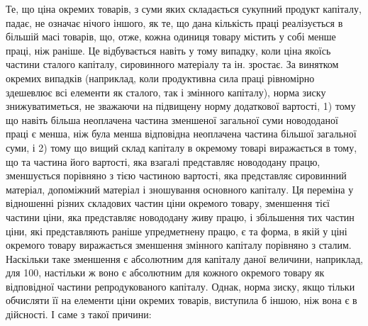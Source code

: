 Те, що ціна окремих товарів, з суми яких складається сукупний продукт капіталу, падає, не означає
нічого іншого, як те, що дана кількість праці реалізується в більшій масі товарів, що, отже, кожна
одиниця товару містить у собі менше праці, ніж раніше. Це відбувається навіть у тому випадку, коли
ціна якоїсь частини сталого капіталу, сировинного матеріалу та ін. зростає. За винятком окремих
випадків (наприклад, коли продуктивна сила праці рівномірно здешевлює всі елементи як сталого, так і
змінного капіталу), норма зиску знижуватиметься, не зважаючи на підвищену норму додаткової вартості,
1) тому що навіть більша неоплачена частина зменшеної загальної суми новододаної праці є менша, ніж
була менша відповідна неоплачена частина більшої загальної суми, і 2) тому що вищий склад капіталу в
окремому товарі виражається в тому, що та частина його вартості, яка взагалі представляє новододану
працю, зменшується порівняно з тією частиною вартості, яка представляє сировинний матеріал,
допоміжний матеріал і зношування основного капіталу. Ця переміна у відношенні різних складових
частин ціни окремого товару, зменшення тієї частини ціни, яка представляє новододану живу працю, і
збільшення тих частин ціни, які представляють раніше упредметнену працю, є та форма, в якій у ціні
окремого товару виражається зменшення змінного капіталу порівняно з сталим. Наскільки таке зменшення
є абсолютним для капіталу даної величини, наприклад, для 100, настільки ж воно є абсолютним для
кожного окремого товару як відповідної частини репродукованого капіталу. Однак, норма зиску, якщо
тільки обчисляти її на елементи ціни окремих товарів, виступила б іншою, ніж вона є в дійсності. І
саме з такої причини:
